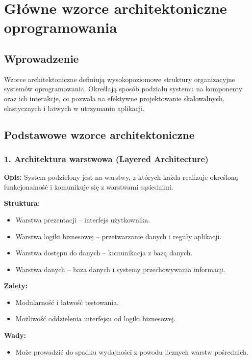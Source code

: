 \section{Główne wzorce architektoniczne oprogramowania}

\subsection{Wprowadzenie}
Wzorce architektoniczne definiują wysokopoziomowe struktury organizacyjne systemów oprogramowania. Określają sposób podziału systemu na komponenty oraz ich interakcje, co pozwala na efektywne projektowanie skalowalnych, elastycznych i łatwych w utrzymaniu aplikacji.

\subsection{Podstawowe wzorce architektoniczne}

\subsubsection{1. Architektura warstwowa (Layered Architecture)}
\textbf{Opis:}  
System podzielony jest na warstwy, z których każda realizuje określoną funkcjonalność i komunikuje się z warstwami sąsiednimi.

\textbf{Struktura:}
\begin{itemize}
    \item Warstwa prezentacji – interfejs użytkownika.
    \item Warstwa logiki biznesowej – przetwarzanie danych i reguły aplikacji.
    \item Warstwa dostępu do danych – komunikacja z bazą danych.
    \item Warstwa danych – baza danych i systemy przechowywania informacji.
\end{itemize}

\textbf{Zalety:}
\begin{itemize}
    \item Modularność i łatwość testowania.
    \item Możliwość oddzielenia interfejsu od logiki biznesowej.
\end{itemize}

\textbf{Wady:}
\begin{itemize}
    \item Może prowadzić do spadku wydajności z powodu licznych warstw pośrednich.
\end{itemize}

